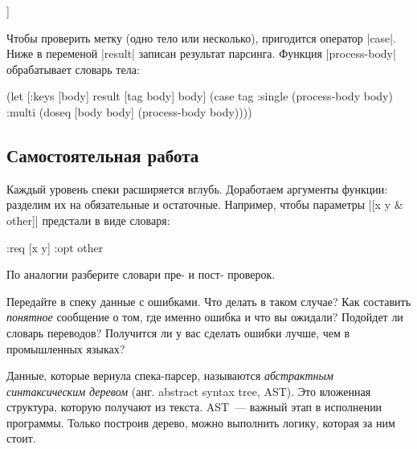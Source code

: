 \begin{english}
  \begin{clojure}
[:multi [{:args [x] :code [(println 1)]}
         {:args [x y] :code [(println 2)]}]]
  \end{clojure}
\end{english}

Чтобы проверить метку (одно тело или несколько), пригодится оператор
\spverb|case|. Ниже в переменой \spverb|result| записан результат
парсинга. Функция \spverb|process-body| обрабатывает словарь тела:

\begin{english}
  \begin{clojure}
(let [{:keys [body]} result
      [tag body] body]
  (case tag
    :single
    (process-body body)
    :multi
    (doseq [body body]
      (process-body body))))
  \end{clojure}
\end{english}

\subsection{Самостоятельная работа}


Каждый уровень спеки расширяется вглубь. Доработаем аргументы функции: разделим
их на обязательные и остаточные. Например, чтобы параметры \spverb|[x y & other]|
предстали в виде словаря:

\begin{english}
  \begin{clojure}
{:req [x y] :opt other}
  \end{clojure}
\end{english}

\noindent
По аналогии разберите словари пре- и пост- проверок.

Передайте в спеку данные с ошибками. Что делать в таком случае? Как составить
\emph{понятное} сообщение о том, где именно ошибка и что вы ожидали? Подойдет ли
словарь переводов? Получится ли у вас сделать ошибки лучше, чем в промышленных
языках?

Данные, которые вернула спека-парсер, называются \emph{абстрактным синтаксическим деревом}
(анг. abstract syntax tree, AST).
Это вложенная структура, которую получают из текста. AST~--- важный этап в исполнении
программы. Только построив дерево, можно выполнить логику, которая за ним стоит.

